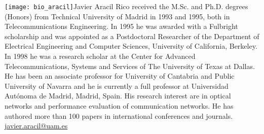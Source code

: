 \documentclass[AMA,STIX1COL]{WileyNJD-v2}
\begin{document}
\begin{biography}{\texttt{[image: bio\_aracil]}}{{Javier Aracil Rico}
received the M.Sc. and Ph.D. degrees (Honors) from Technical University of Madrid in 1993 and 1995, both in Telecommunications Engineering. In 1995 he was awarded with a Fulbright scholarship and was appointed as a Postdoctoral Researcher of the Department of Electrical Engineering and Computer Sciences, University of California, Berkeley. In 1998 he was a research scholar at the Center for Advanced Telecommunications, Systems and Services of The University of Texas at Dallas. He has been an associate professor for University of Cantabria and Public University of Navarra and he is currently a full professor at Universidad Aut\'onoma de Madrid, Madrid, Spain. His research interest are in optical networks and performance evaluation of communication networks. He has authored more than 100 papers in international conferences and journals.  } %
\hfill \href{mailto:javier.aracil@uam.es}{javier.aracil@uam.es}
\end{biography}
\end{document}
